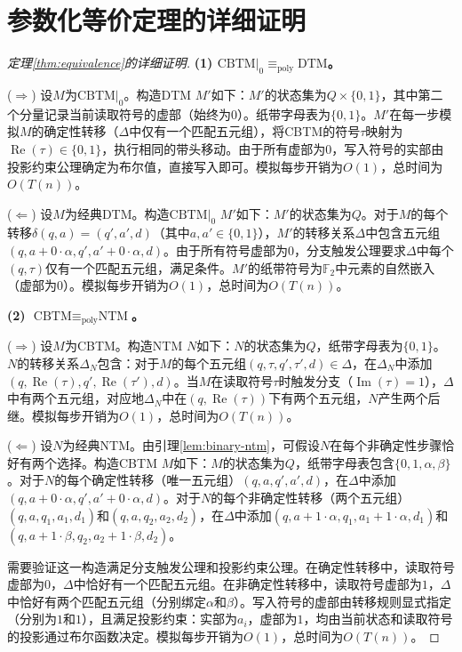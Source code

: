 \documentclass{ctexart}
\newtheorem{proof}[theorem]{证明}
\begin{document}
	\section{参数化等价定理的详细证明}
	
	\begin{proof}[定理\ref{thm:equivalence}的详细证明]
		\textbf{(1) $\text{CBTM}|_0 \equiv_{\text{poly}} \text{DTM}$。}
		
		($\Rightarrow$) 设$M$为$\text{CBTM}|_0$。构造DTM $M'$如下：$M'$的状态集为$Q \times \{0,1\}$，其中第二个分量记录当前读取符号的虚部（始终为$0$）。纸带字母表为$\{0,1\}$。$M'$在每一步模拟$M$的确定性转移（$\Delta$中仅有一个匹配五元组），将CBTM的符号$\tau$映射为$\operatorname{Re}(\tau) \in \{0,1\}$，执行相同的带头移动。由于所有虚部为$0$，写入符号的实部由投影约束公理确定为布尔值，直接写入即可。模拟每步开销为$O(1)$，总时间为$O(T(n))$。
		
		($\Leftarrow$) 设$M$为经典DTM。构造$\text{CBTM}|_0$ $M'$如下：$M'$的状态集为$Q$。对于$M$的每个转移$\delta(q,a) = (q',a',d)$（其中$a,a' \in \{0,1\}$），$M'$的转移关系$\Delta$中包含五元组$(q, a+0\cdot\alpha, q', a'+0\cdot\alpha, d)$。由于所有符号虚部为$0$，分支触发公理要求$\Delta$中每个$(q,\tau)$仅有一个匹配五元组，满足条件。$M'$的纸带符号为$\mathbb{F}_2$中元素的自然嵌入（虚部为$0$）。模拟每步开销为$O(1)$，总时间为$O(T(n))$。
		
		\textbf{(2) $\text{CBTM} \equiv_{\text{poly}} \text{NTM}$。}
		
		($\Rightarrow$) 设$M$为CBTM。构造NTM $N$如下：$N$的状态集为$Q$，纸带字母表为$\{0,1\}$。$N$的转移关系$\Delta_N$包含：对于$M$的每个五元组$(q,\tau,q',\tau',d) \in \Delta$，在$\Delta_N$中添加$(q,\operatorname{Re}(\tau),q',\operatorname{Re}(\tau'),d)$。当$M$在读取符号$\tau$时触发分支（$\operatorname{Im}(\tau)=1$），$\Delta$中有两个五元组，对应地$\Delta_N$中在$(q,\operatorname{Re}(\tau))$下有两个五元组，$N$产生两个后继。模拟每步开销为$O(1)$，总时间为$O(T(n))$。
		
		($\Leftarrow$) 设$N$为经典NTM。由引理\ref{lem:binary-ntm}，可假设$N$在每个非确定性步骤恰好有两个选择。构造CBTM $M$如下：$M$的状态集为$Q$，纸带字母表包含$\{0,1,\alpha,\beta\}$。对于$N$的每个确定性转移（唯一五元组）$(q,a,q',a',d)$，在$\Delta$中添加$(q, a+0\cdot\alpha, q', a'+0\cdot\alpha, d)$。对于$N$的每个非确定性转移（两个五元组）$(q,a,q_1,a_1,d_1)$和$(q,a,q_2,a_2,d_2)$，在$\Delta$中添加$(q, a+1\cdot\alpha, q_1, a_1+1\cdot\alpha, d_1)$和$(q, a+1\cdot\beta, q_2, a_2+1\cdot\beta, d_2)$。
		
		需要验证这一构造满足分支触发公理和投影约束公理。在确定性转移中，读取符号虚部为$0$，$\Delta$中恰好有一个匹配五元组。在非确定性转移中，读取符号虚部为$1$，$\Delta$中恰好有两个匹配五元组（分别绑定$\alpha$和$\beta$）。写入符号的虚部由转移规则显式指定（分别为$1$和$1$），且满足投影约束：实部为$a_i$，虚部为$1$，均由当前状态和读取符号的投影通过布尔函数决定。模拟每步开销为$O(1)$，总时间为$O(T(n))$。
	\end{proof}
	
\end{document}
